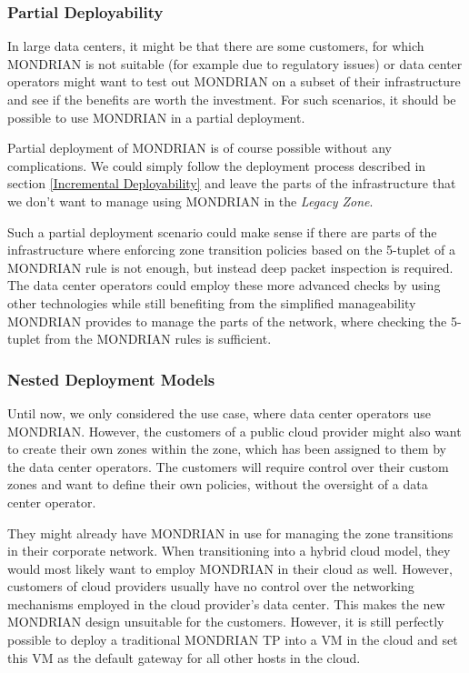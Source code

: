 \subsubsection{Partial Deployability}
In large data centers, it might be that there are some customers, for which MONDRIAN is not suitable (for example due to regulatory issues) or data center operators might want to test out MONDRIAN on a subset of their infrastructure and see if the benefits are worth the investment. For such scenarios, it should be possible to use MONDRIAN in a partial deployment.

Partial deployment of MONDRIAN is of course possible without any complications. We could simply follow the deployment process described in section \ref{Incremental Deployability} and leave the parts of the infrastructure that we don't want to manage using MONDRIAN in the \textit{Legacy Zone}.

Such a partial deployment scenario could make sense if there are parts of the infrastructure where enforcing zone transition policies based on the 5-tuplet of a MONDRIAN rule is not enough, but instead deep packet inspection is required. The data center operators could employ these more advanced checks by using other technologies while still benefiting from the simplified manageability MONDRIAN provides to manage the parts of the network, where checking the 5-tuplet from the MONDRIAN rules is sufficient.

\subsubsection{Nested Deployment Models}

Until now, we only considered the use case, where data center operators use MONDRIAN. However, the customers of a public cloud provider might also want to create their own zones within the zone, which has been assigned to them by the data center operators. The customers will require control over their custom zones and want to define their own policies, without the oversight of a data center operator. 

They might already have MONDRIAN in use for managing the zone transitions in their corporate network. When transitioning into a hybrid cloud model, they would most likely want to employ MONDRIAN in their cloud as well. However, customers of cloud providers usually have no control over the networking mechanisms employed in the cloud provider's data center. This makes the new MONDRIAN design unsuitable for the customers. However, it is still perfectly possible to deploy a traditional MONDRIAN \acs{TP} into a \acs{VM} in the cloud and set this \acs{VM} as the default gateway for all other hosts in the cloud. 

